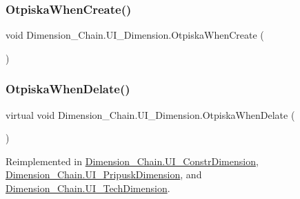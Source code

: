 \subsubsection{\texorpdfstring{Otpiska\+When\+Create()}{OtpiskaWhenCreate()}}
{\footnotesize\ttfamily void Dimension\+\_\+\+Chain.\+U\+I\+\_\+\+Dimension.\+Otpiska\+When\+Create (\begin{DoxyParamCaption}{ }\end{DoxyParamCaption})}

\mbox{\label{class_dimension___chain_1_1_u_i___dimension_aad38da2794443edfca137c15e417bfd3}} 
\subsubsection{\texorpdfstring{Otpiska\+When\+Delate()}{OtpiskaWhenDelate()}}
{\footnotesize\ttfamily virtual void Dimension\+\_\+\+Chain.\+U\+I\+\_\+\+Dimension.\+Otpiska\+When\+Delate (\begin{DoxyParamCaption}{ }\end{DoxyParamCaption})\hspace{0.3cm}{\ttfamily [virtual]}}



Reimplemented in \mbox{\hyperlink{class_dimension___chain_1_1_u_i___constr_dimension_a3815be9b5b88d93c7912b14b4a61d587}{Dimension\+\_\+\+Chain.\+U\+I\+\_\+\+Constr\+Dimension}}, \mbox{\hyperlink{class_dimension___chain_1_1_u_i___pripusk_dimension_a68204a8c2d20a3076f2a3bdd3e9bb97a}{Dimension\+\_\+\+Chain.\+U\+I\+\_\+\+Pripusk\+Dimension}}, and \mbox{\hyperlink{class_dimension___chain_1_1_u_i___tech_dimension_a4c37ac44bbc3b0fdf564e42961353a5f}{Dimension\+\_\+\+Chain.\+U\+I\+\_\+\+Tech\+Dimension}}.

\mbox{\label{class_dimension___chain_1_1_u_i___dimension_ac655b429f2293b499eb3c597ebd74b95}} 
